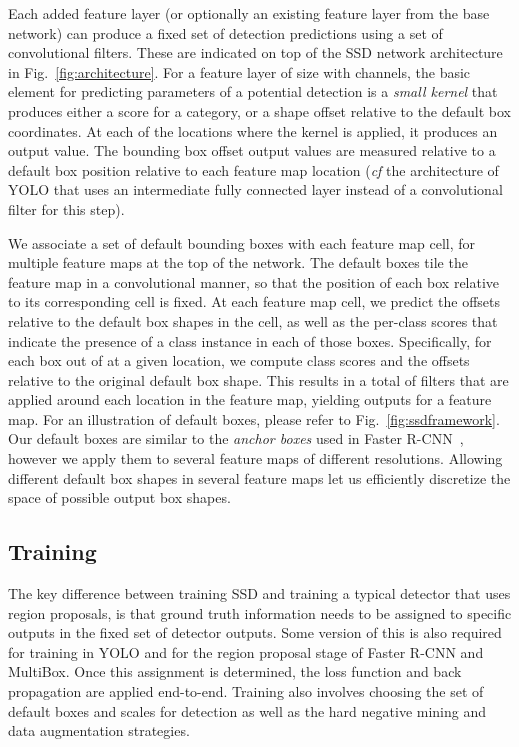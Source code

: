 \documentclass[runningheads]{llncs}
\begin{document}
\smallskip
{} Each added feature layer (or optionally an existing feature layer from the base network) can produce a fixed set of detection predictions using a set of convolutional filters. These are indicated on top of the SSD network architecture in Fig.~\ref{fig:architecture}.  For a feature layer of size  with  channels, the basic element for predicting parameters of a potential detection is a  {\em small kernel} that produces either a score for a category, or a shape offset relative to the default box coordinates. At each of the  locations where the kernel is applied, it produces an output value. The bounding box offset output values are measured relative to a default box position relative to each feature map location ({\em cf} the architecture of YOLO\cite{redmon2015you} that uses an intermediate fully connected layer instead of a convolutional filter for this step).

\smallskip
{} We associate a set of default bounding boxes with each feature map cell, for multiple feature maps at the top of the network. The default boxes tile the feature map in a convolutional manner, so that the position of each box relative to its corresponding cell is fixed. At each feature map cell, we predict the offsets relative to the default box shapes in the cell, as well as the per-class scores that indicate the presence of a class instance in each of those boxes. Specifically, for each box out of  at a given location, we compute  class scores and the  offsets relative to the original default box shape. This results in a total of  filters that are applied around each location in the feature map, yielding  outputs for a  feature map. For an illustration of default boxes, please refer to Fig.~\ref{fig:ssdframework}. Our default boxes are similar to the {\it anchor boxes} used in Faster R-CNN~\cite{ren2015faster}, however we apply them to several feature maps of different resolutions. Allowing different default box shapes in several feature maps let us efficiently discretize the space of possible output box shapes.

\subsection{Training}
\label{sec:ssdtraining}

The key difference between training SSD and training a typical detector that uses region proposals, is that ground truth information needs to be assigned to specific outputs in the fixed set of detector outputs. Some version of this is also required for training in YOLO\cite{redmon2015you} and for the region proposal stage of Faster R-CNN\cite{ren2015faster} and MultiBox\cite{erhan2014scalable}. Once this assignment is determined, the loss function and back propagation are applied end-to-end. Training also involves choosing the set of default boxes and scales for detection as well as the hard negative mining and data augmentation strategies.
\end{document}
